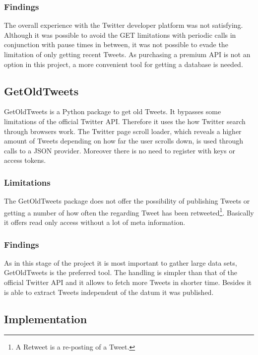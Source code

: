 \documentclass[conference]{IEEEtran}
\begin{document}
\subsubsection{Findings}

The overall experience with the Twitter developer platform was not satisfying. Although it was possible to avoid the GET limitations with periodic calls in conjunction with pause times in between, it was not possible to evade the limitation of only getting recent Tweets. As purchasing a premium API is not an option in this project, a more convenient tool for getting a database is needed.

\subsection{GetOldTweets}\label{subsec_got}

GetOldTweets \cite{got} is a Python package to get old Tweets. It bypasses some limitations of the official Twitter API. Therefore it uses the how Twitter search through browsers work. The Twitter page scroll loader, which reveals a higher amount of Tweets depending on how far the user scrolls down, is used through calls to a JSON provider. Moreover there is no need to register with keys or access tokens.

\subsubsection{Limitations}

The GetOldTweets \cite{got} package does not offer the possibility of publishing Tweets or getting a number of how often the regarding Tweet has been retweeted\footnote{A Retweet is a re-posting of a Tweet.}. Basically it offers read only access without a lot of meta information.

\subsubsection{Findings}

As in this stage of the project it is most important to gather large data sets, GetOldTweets \cite{got} is the preferred tool. The handling is simpler than that of the official Twitter API and it allows to fetch more Tweets in shorter time. Besides it is able to extract Tweets independent of the datum it was published. 

\subsection{Implementation}
\end{document}
